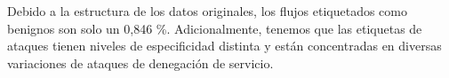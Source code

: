 \documentclass[10pt,a4paper,twoside]{article}
\begin{document}
\begin{multicols}{2}
    \begin{table}[H]
        \begin{center}
        \end{center}
        \caption{Tiempos de análisis}
        \label{table:statstimeoffline}
    \end{table}

    \begin{table}[H]
        \begin{center}
        \end{center}
        \caption{Archivos generados durante el análisis}
        \label{table:generatedfilesoffline}
    \end{table}

    Debido a la estructura de los datos originales, los flujos etiquetados como benignos son solo un 0,846 \%. Adicionalmente, tenemos que las etiquetas de ataques tienen niveles de especificidad distinta y están concentradas en diversas variaciones de ataques de denegación de servicio.


\end{multicols}
\end{document}
